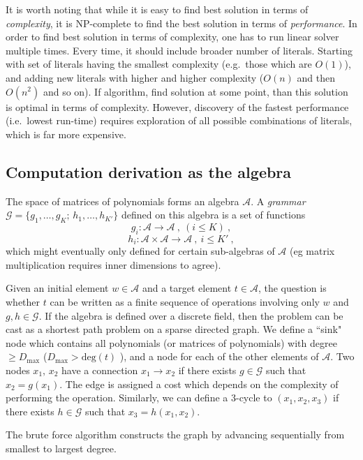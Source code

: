 It is worth noting that while it is easy to find best solution in
terms of {\em complexity}, it is NP-complete to find the best solution
in terms of {\em performance}. In order to find best solution in terms
of complexity, one has to run linear solver multiple times. Every
time, it should include broader number of literals. Starting with set
of literals having the smallest complexity (e.g.~those which are
$O(1)$), and adding new literals with higher and higher complexity
($O(n)$ and then $O(n^2)$ and so on). If algorithm, find solution at
some point, than this solution is optimal in terms of
complexity. However, discovery of the fastest performance (i.e.~lowest
run-time) requires exploration of all possible combinations of literals,
which is far more expensive.  

\subsection{Computation derivation as the algebra}
The space of matrices of polynomials forms an algebra $\mathcal{A}$.
A \emph{grammar} $\mathcal{G}=\{g_1,\dots,g_{K};\, h_1,\dots, h_{K'}\}$ defined on this algebra is a set of functions
$$g_i : \mathcal{A} \longrightarrow \mathcal{A}~,~(i \leq K)~,$$
$$h_{i} : \mathcal{A} \times \mathcal{A} \longrightarrow \mathcal{A}~, ~i \leq K'~,$$
which might eventually only defined for certain sub-algebras of $\mathcal{A}$ 
(eg matrix multiplication requires inner dimensions to agree). 

Given an initial element $w \in \mathcal{A}$ and a target element $t \in \mathcal{A}$, 
the question is whether $t$ can be written as a finite sequence of operations involving 
only $w$ and $g,h \in \mathcal{G}$.
If the algebra is defined over a discrete field, then the problem can be  
cast as a shortest path problem on a sparse directed graph. 
We define a ``sink" node which contains all polynomials (or matrices of polynomials) with degree $\geq D_{\max}$ 
($D_{\max} > \mbox{deg}(t)$ ), and a node for each of the other elements of $\mathcal{A}$. 
Two nodes $x_1,\,x_2$ have a connection $x_1 \rightarrow x_2$ if there exists $g \in \mathcal{G}$ such that
$x_2 = g(x_1)$. The edge is assigned a cost which depends on the complexity of performing the operation.   
Similarly, we can define a 3-cycle to $(x_1,x_2,x_3)$ if there exists $h \in \mathcal{G}$ such that $x_3 = h(x_1,x_2)$.

The brute force algorithm constructs the graph by advancing sequentially from smallest to largest degree. 


